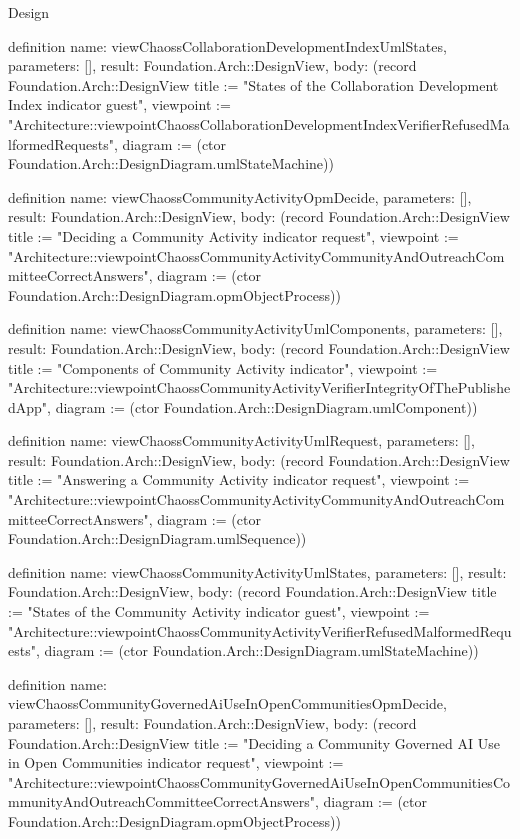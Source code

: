 \begin{lexlean}{Design}
\begin{semanticmodule}
definition{
  name: viewChaossCollaborationDevelopmentIndexUmlStates,
  parameters: [],
  result: Foundation.Arch::DesignView,
  body: (record Foundation.Arch::DesignView {title := "States of the Collaboration Development Index indicator guest", viewpoint := "Architecture::viewpointChaossCollaborationDevelopmentIndexVerifierRefusedMalformedRequests", diagram := (ctor Foundation.Arch::DesignDiagram.umlStateMachine)})
}

definition{
  name: viewChaossCommunityActivityOpmDecide,
  parameters: [],
  result: Foundation.Arch::DesignView,
  body: (record Foundation.Arch::DesignView {title := "Deciding a Community Activity indicator request", viewpoint := "Architecture::viewpointChaossCommunityActivityCommunityAndOutreachCommitteeCorrectAnswers", diagram := (ctor Foundation.Arch::DesignDiagram.opmObjectProcess)})
}

definition{
  name: viewChaossCommunityActivityUmlComponents,
  parameters: [],
  result: Foundation.Arch::DesignView,
  body: (record Foundation.Arch::DesignView {title := "Components of Community Activity indicator", viewpoint := "Architecture::viewpointChaossCommunityActivityVerifierIntegrityOfThePublishedApp", diagram := (ctor Foundation.Arch::DesignDiagram.umlComponent)})
}

definition{
  name: viewChaossCommunityActivityUmlRequest,
  parameters: [],
  result: Foundation.Arch::DesignView,
  body: (record Foundation.Arch::DesignView {title := "Answering a Community Activity indicator request", viewpoint := "Architecture::viewpointChaossCommunityActivityCommunityAndOutreachCommitteeCorrectAnswers", diagram := (ctor Foundation.Arch::DesignDiagram.umlSequence)})
}

definition{
  name: viewChaossCommunityActivityUmlStates,
  parameters: [],
  result: Foundation.Arch::DesignView,
  body: (record Foundation.Arch::DesignView {title := "States of the Community Activity indicator guest", viewpoint := "Architecture::viewpointChaossCommunityActivityVerifierRefusedMalformedRequests", diagram := (ctor Foundation.Arch::DesignDiagram.umlStateMachine)})
}

definition{
  name: viewChaossCommunityGovernedAiUseInOpenCommunitiesOpmDecide,
  parameters: [],
  result: Foundation.Arch::DesignView,
  body: (record Foundation.Arch::DesignView {title := "Deciding a Community Governed AI Use in Open Communities indicator request", viewpoint := "Architecture::viewpointChaossCommunityGovernedAiUseInOpenCommunitiesCommunityAndOutreachCommitteeCorrectAnswers", diagram := (ctor Foundation.Arch::DesignDiagram.opmObjectProcess)})
}


\end{semanticmodule}
\end{lexlean}
